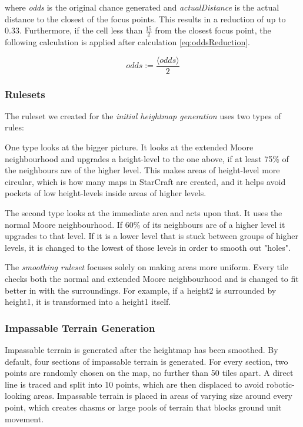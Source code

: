 where \textit{odds} is the original chance generated and \textit{actualDistance} is the actual distance to the closest of the focus points. This results in a reduction of up to 0.33. Furthermore, if the cell less than $\frac{15}{2}$ from the closest focus point, the following calculation is applied after calculation \ref{eq:oddsReduction}.

\begin{equation}
	odds := \frac{\langle odds\rangle}{2}
\end{equation}

\subsubsection{Rulesets}
\label{methodology_ca_our_rulesets}

The ruleset we created for the \textit{initial heightmap generation} uses two types of rules:

One type looks at the bigger picture. It looks at the extended Moore neighbourhood and upgrades a height-level to the one above, if at least 75\% of the neighbours are of the higher level. This makes areas of height-level more circular, which is how many maps in StarCraft are created, and it helps avoid pockets of low height-levels inside areas of higher levels.

The second type looks at the immediate area and acts upon that. It uses the normal Moore neighbourhood. If 60\% of its neighbours are of a higher level it upgrades to that level. If it is a lower level that is stuck between groups of higher levels, it is changed to the lowest of those levels in order to smooth out "holes".

The \textit{smoothing ruleset} focuses solely on making areas more uniform. Every tile checks both the normal and extended Moore neighbourhood and is changed to fit better in with the surroundings. For example, if a height2 is surrounded by height1, it is transformed into a height1 itself.

\subsubsection{Impassable Terrain Generation}
\label{methodology_ca_our_impassable}

Impassable terrain is generated after the heightmap has been smoothed. By default, four sections of impassable terrain is generated. For every section, two points are randomly chosen on the map, no further than 50 tiles apart. A direct line is traced and split into 10 points, which are then displaced to avoid robotic-looking areas. Impassable terrain is placed in areas of varying size around every point, which creates chasms or large pools of terrain that blocks ground unit movement.